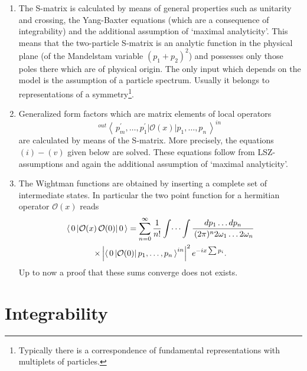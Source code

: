 \documentclass[a4paper,12pt]{article}
\begin{document}
\begin{enumerate}
\item  The S-matrix is calculated by means of general properties such as
unitarity and crossing, the Yang-Baxter equations (which are a consequence
of integrability) and the additional assumption of `maximal analyticity'.
This means that the two-particle S-matrix is an analytic function in the
physical plane (of the Mandelstam variable $(p_{1}+p_{2})^{2}$) and
possesses only those poles there which are of physical origin. The only
input which depends on the model is the assumption of a particle spectrum.
Usually it belongs to representations of a symmetry\footnote{%
Typically there is a correspondence of fundamental representations with
multiplets of particles.}.

\item  Generalized form factors which are matrix elements of local operators 
\[
^{out}\left\langle \,p_{m}^{\prime },\ldots ,p_{1}^{\prime }\left| \mathcal{O%
}(x)\right| p_{1},\ldots ,p_{n}\,\right\rangle ^{in}\, 
\]
are calculated by means of the S-matrix. More precisely, the equations $%
(i)-(v)$ given below are solved. These equations follow from LSZ-assumptions
and again the additional assumption of `maximal analyticity'.

\item  The Wightman functions are obtained by inserting a complete set of
intermediate states. In particular the two point function for a hermitian
operator $\mathcal{O}(x)$ reads 
\begin{multline*}
\langle \,0\left| \mathcal{O}(x)\,\mathcal{O}(0)\right| 0\,\rangle
=\sum_{n=0}^{\infty }\frac{1}{n!}\int \dots \int \frac{dp_{1}\ldots dp_{n}}{%
\,(2\pi )^{n}2\omega _{1}\dots 2\omega _{n}} \\
\times \left| \left\langle \,0\left| \mathcal{O}(0)\right| p_{1},\ldots
,p_{n}\,\right\rangle ^{in}\right| ^{2}e^{-ix\sum p_{i}}.
\end{multline*}
Up to now a proof that these sums converge does not exists.
\end{enumerate}

\section{Integrability}
\end{document}

